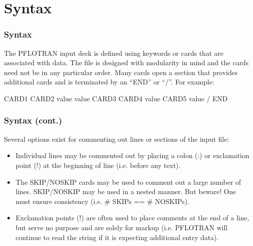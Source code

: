 \section{Syntax}

\begin{frame}[containsverbatim]\frametitle{Syntax}

The PFLOTRAN input deck is defined using keywords or cards that are associated with data.  The file is designed with modularity in mind and the cards need not be in any particular order.  Many cards open a section that provides additional cards and is terminated by an ``END'' or ``/''.  For example:

\begin{semiverbatim}
CARD1
  CARD2 value value
  CARD3
    CARD4 value
    CARD5 value
  /
END
\end{semiverbatim}

\end{frame}

\begin{frame}[fragile]\frametitle{Syntax (cont.)}
Several options exist for commenting out lines or sections of the input file:
\begin{itemize}
\item Individual lines may be commented out by placing a colon (:) or exclamation point (!) at the beginning of line (i.e. before any text).
\item The SKIP/NOSKIP cards may be used to comment out a large number of lines.  SKIP/NOSKIP may be used in a nested manner.  But beware!  One must ensure consistency (i.e. \# SKIPs == \# NOSKIPs).
\item Exclamation points (!) are often used to place comments at the end of a line, but serve no purpose and are solely for markup (i.e. PFLOTRAN will continue to read the string if it is expecting additional entry data).
\end{itemize}

\end{frame}
